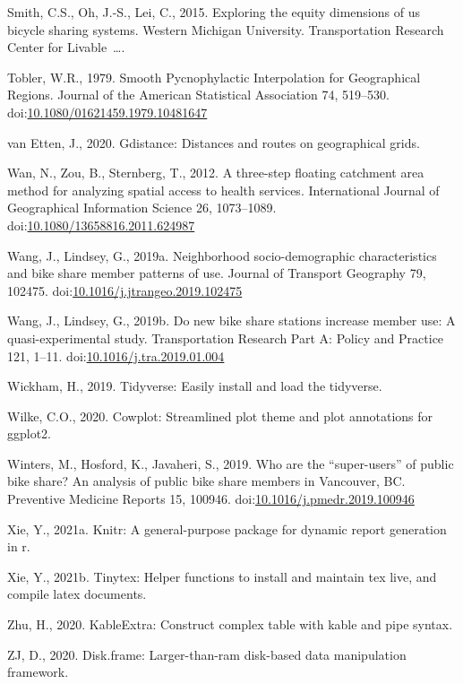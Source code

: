 \documentclass[]{elsarticle} %
\begin{document}
\leavevmode\hypertarget{ref-smith2015exploring}{}%
Smith, C.S., Oh, J.-S., Lei, C., 2015. Exploring the equity dimensions
of us bicycle sharing systems. Western Michigan University.
Transportation Research Center for Livable~\ldots.

\leavevmode\hypertarget{ref-toblerSmoothPycnophylacticInterpolation1979}{}%
Tobler, W.R., 1979. Smooth Pycnophylactic Interpolation for Geographical
Regions. Journal of the American Statistical Association 74, 519--530.
doi:\href{https://doi.org/10.1080/01621459.1979.10481647}{10.1080/01621459.1979.10481647}

\leavevmode\hypertarget{ref-R-gdistance}{}%
van Etten, J., 2020. Gdistance: Distances and routes on geographical
grids.

\leavevmode\hypertarget{ref-wanThreestepFloatingCatchment2012}{}%
Wan, N., Zou, B., Sternberg, T., 2012. A three-step floating catchment
area method for analyzing spatial access to health services.
International Journal of Geographical Information Science 26,
1073--1089.
doi:\href{https://doi.org/10.1080/13658816.2011.624987}{10.1080/13658816.2011.624987}

\leavevmode\hypertarget{ref-wangNeighborhoodSociodemographicCharacteristics2019}{}%
Wang, J., Lindsey, G., 2019a. Neighborhood socio-demographic
characteristics and bike share member patterns of use. Journal of
Transport Geography 79, 102475.
doi:\href{https://doi.org/10.1016/j.jtrangeo.2019.102475}{10.1016/j.jtrangeo.2019.102475}

\leavevmode\hypertarget{ref-wangNewBikeShare2019}{}%
Wang, J., Lindsey, G., 2019b. Do new bike share stations increase member
use: A quasi-experimental study. Transportation Research Part A: Policy
and Practice 121, 1--11.
doi:\href{https://doi.org/10.1016/j.tra.2019.01.004}{10.1016/j.tra.2019.01.004}

\leavevmode\hypertarget{ref-R-tidyverse}{}%
Wickham, H., 2019. Tidyverse: Easily install and load the tidyverse.

\leavevmode\hypertarget{ref-R-cowplot}{}%
Wilke, C.O., 2020. Cowplot: Streamlined plot theme and plot annotations
for ggplot2.

\leavevmode\hypertarget{ref-wintersWhoAreSuperusers2019}{}%
Winters, M., Hosford, K., Javaheri, S., 2019. Who are the
``super-users'' of public bike share? An analysis of public bike share
members in Vancouver, BC. Preventive Medicine Reports 15, 100946.
doi:\href{https://doi.org/10.1016/j.pmedr.2019.100946}{10.1016/j.pmedr.2019.100946}

\leavevmode\hypertarget{ref-R-knitr}{}%
Xie, Y., 2021a. Knitr: A general-purpose package for dynamic report
generation in r.

\leavevmode\hypertarget{ref-R-tinytex}{}%
Xie, Y., 2021b. Tinytex: Helper functions to install and maintain tex
live, and compile latex documents.

\leavevmode\hypertarget{ref-R-kableExtra}{}%
Zhu, H., 2020. KableExtra: Construct complex table with kable and pipe
syntax.

\leavevmode\hypertarget{ref-R-disk.frame}{}%
ZJ, D., 2020. Disk.frame: Larger-than-ram disk-based data manipulation
framework.
\end{document}
